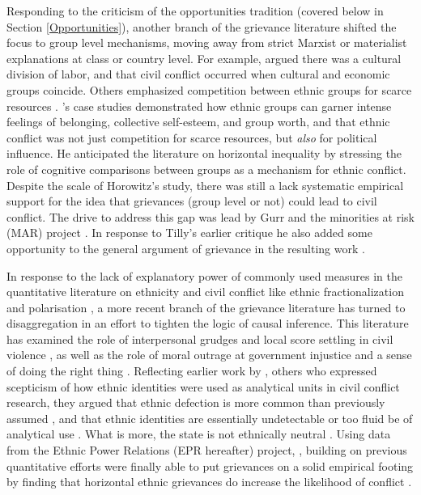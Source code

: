 Responding to the criticism of the opportunities tradition (covered below in Section
\ref{Opportunities}), another branch of the grievance literature shifted the
focus to group level mechanisms, moving away from strict Marxist or materialist
explanations at class or country level. For example, \citet{Hechter_1978} argued
there was a cultural division of labor, and that civil conflict occurred when
cultural and economic groups coincide. Others emphasized competition between
ethnic groups for scarce resources \citep{barth1969}. \citet{Horowitz1985}'s
case studies demonstrated how ethnic groups can garner intense feelings of
belonging, collective self-esteem, and group worth, and that ethnic conflict was
not just competition for scarce resources, but \textit{also} for political
influence. He anticipated the literature on horizontal inequality by stressing
the role of cognitive comparisons between groups as a mechanism for ethnic
conflict. Despite the scale of Horowitz's study, there was still a lack
systematic empirical support for the idea that grievances (group level or not)
could lead to civil conflict. The drive to address this gap was lead by Gurr and
the minorities at risk (MAR) project \citep{GurrTedRobert1993Mar:}. In response
to Tilly's earlier critique he also added some opportunity to the general
argument of grievance in the resulting work \citep{Gurr_1993}. 

In response to the lack of explanatory power of commonly used measures in the
quantitative literature on ethnicity and civil conflict like ethnic
fractionalization \citep{Alesina2003, Posner2004} and polarisation
\citep{Montalvo2005}, a more recent branch of the grievance literature has
turned to disaggregation in an effort to tighten the logic of causal inference.
This literature has examined  the role of interpersonal grudges and local score
settling in civil violence \citep{Kalyvas2006, Kalyvas_2008}, as well as the
role of moral outrage at government injustice and a sense of doing the right
thing \citep{Wood2003}. Reflecting earlier work by \citet{barth1969}, others who
expressed scepticism of how ethnic identities were used as analytical units in
civil conflict research, they argued that ethnic defection is more common than
previously assumed \citep{Kalyvas_2008, Staniland_2012}, and that ethnic
identities are essentially undetectable or too fluid be of analytical use
\citep{Gilley_2004, Chandra2006}. What is more, the state is not ethnically
neutral \citep{CedermanLars-Erik2013Igac}. Using data from the Ethnic Power
Relations (EPR hereafter) project, \citet{CedermanLars-Erik2013Igac}, building
on previous quantitative efforts \citep{Gurr_1993, Goldstone_2010} were finally
able to put grievances on a solid empirical footing by finding that horizontal
ethnic grievances do increase the likelihood of conflict
\citep{CedermanLars-Erik2013Igac}. 

